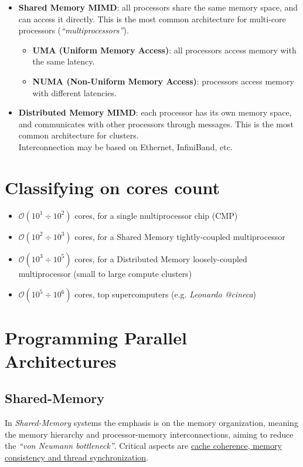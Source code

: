 \begin{paracol}{2}
   \begin{itemize}
      \item \textbf{Shared Memory MIMD}: all processors share the same memory space, and can access it directly. This is the most common architecture for multi-core processors (\textit{``multiprocessors''}).
      \begin{itemize}
         \item \textbf{UMA (Uniform Memory Access)}: all processors access memory with the same latency.
         \item \textbf{NUMA (Non-Uniform Memory Access)}: processors access memory with different latencies.
      \end{itemize}
      \item \textbf{Distributed Memory MIMD}: each processor has its own memory space, and communicates with other processors through messages. This is the most common architecture for clusters.\\
      Interconnection may be based on Ethernet, InfiniBand, etc.
   \end{itemize}
\end{paracol}

\section{Classifying on cores count}
\begin{itemize}
   \item $\mathcal{O}(10^1 \div 10^2)$ cores, for a single multiprocessor chip (CMP)
   \item $\mathcal{O}(10^2 \div 10^3)$ cores, for a Shared Memory tightly-coupled multiprocessor
   \item $\mathcal{O}(10^3 \div 10^5)$ cores, for a Distributed Memory loosely-coupled multiprocessor (small to large compute clusters)
   \item $\mathcal{O}(10^5 \div 10^6)$ cores, top supercomputers (e.g. \textit{Leonardo @cineca})
\end{itemize}

\section{Programming Parallel Architectures}
\subsection{Shared-Memory}
In \textit{Shared-Memory} systems the emphasis is on the memory organization, meaning the memory hierarchy and processor-memory interconnections, aiming to reduce the \textit{``von Neumann bottleneck''}.
Critical aspects are \ul{cache coherence, memory consistency and thread synchronization}.

